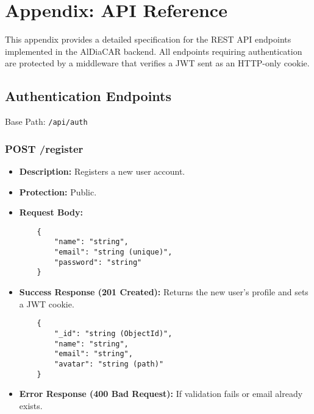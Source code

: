 \chapter{Appendix: API Reference}

This appendix provides a detailed specification for the REST API endpoints implemented in the AlDiaCAR backend. All endpoints requiring authentication are protected by a middleware that verifies a JWT sent as an HTTP-only cookie.

\section{Authentication Endpoints}
Base Path: \texttt{/api/auth}

\subsection{POST /register}
\begin{itemize}
    \item \textbf{Description:} Registers a new user account.
    \item \textbf{Protection:} Public.
    \item \textbf{Request Body:}
    \begin{verbatim}
    {
        "name": "string",
        "email": "string (unique)",
        "password": "string"
    }
    \end{verbatim}
    \item \textbf{Success Response (201 Created):} Returns the new user's profile and sets a JWT cookie.
    \begin{verbatim}
    {
        "_id": "string (ObjectId)",
        "name": "string",
        "email": "string",
        "avatar": "string (path)"
    }
    \end{verbatim}
    \item \textbf{Error Response (400 Bad Request):} If validation fails or email already exists.
\end{itemize}

